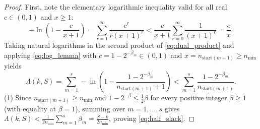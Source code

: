 \documentclass[11pt, a4paper]{amsart}
\theoremstyle{definition}
\begin{document}
\begin{proof}
First, note the elementary logarithmic inequality valid for all real $c \in (0, 1)$ and $x \ge 1$:
\begin{equation}\label{eq:log_lemma}
-\ln\left(1 - \frac{c}{x + 1}\right) = \sum_{r=1}^\infty \frac{c^r}{r (x + 1)^r} < \frac{c}{x + 1} \sum_{r=0}^\infty \frac{1}{(x + 1)^r} = \frac{c}{x}.
\end{equation}
Taking natural logarithms in the second product of \eqref{eq:dual_product} and applying \eqref{eq:log_lemma} with $c = 1 - 2^{-\beta_m} \in (0, 1)$ and $x = n_{\text{start}(m+1)} \ge n_{\min}$ yields
\begin{equation}\label{eq:drift_sum_basic}
\Lambda(k, S) = \sum_{m=1}^s -\ln\left(1 - \frac{1 - 2^{-\beta_m}}{n_{\text{start}(m+1)} + 1}\right) < \sum_{m=1}^s \frac{1 - 2^{-\beta_m}}{n_{\text{start}(m+1)}}.
\end{equation}
(1) Since $n_{\text{start}(m+1)} \ge n_{\min}$ and $1 - 2^{-\beta} \le \frac{1}{2}\beta$ for every positive integer $\beta \ge 1$ (with equality at $\beta = 1$), summing over $m = 1, \dots, s$ gives $\Lambda(k, S) < \frac{1}{2 n_{\min}} \sum_{m=1}^s \beta_m = \frac{S - k}{2 n_{\min}}$, proving \eqref{eq:half_slack}.


\end{proof}
\end{document}
